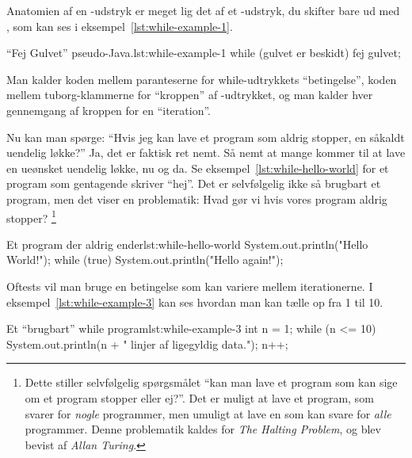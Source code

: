 
		Anatomien af en -udstryk er meget lig det af et
		-udstryk, du skifter bare  ud med
		, som kan ses i eksempel~\ref{lst:while-example-1}.

		\begin{JavaCode}{``Fej Gulvet'' pseudo-Java.}{lst:while-example-1}
			while (gulvet er beskidt) {
				fej gulvet;
			}
		\end{JavaCode}

		Man kalder koden mellem paranteserne for while-udtrykkets ``betingelse'',
		koden mellem tuborg-klammerne for ``kroppen'' af
		-udtrykket, og man kalder hver gennemgang af kroppen
		for en ``iteration''.

		Nu kan man spørge: ``Hvis jeg kan lave et program som aldrig stopper, en
		såkaldt uendelig løkke?'' Ja, det er faktisk ret nemt. Så nemt at mange
		kommer til at lave en ueønsket uendelig løkke, nu og da. Se
		eksempel~\ref{lst:while-hello-world}
		for et program som gentagende skriver ``hej''. Det er selvfølgelig ikke
		så brugbart et program, men det viser en problematik: Hvad gør vi hvis
		vores program aldrig stopper?  \footnote{Dette stiller selvfølgelig spørgsmålet ``kan man lave et program som kan sige om et program stopper eller ej?''. Det er muligt at lave et program, som svarer for \emph{nogle} programmer, men umuligt at lave en som kan svare for \emph{alle} programmer. Denne problematik kaldes for \emph{The Halting Problem}, og blev bevist af \emph{Allan Turing}.}

		\begin{JavaCode}{Et program der aldrig ender}{lst:while-hello-world}
			System.out.println("Hello World!");
			while (true) {
				System.out.println("Hello again!");
			}
		\end{JavaCode}

		 Oftests vil man bruge
		en betingelse som kan variere mellem iterationerne. I
		eksempel~\ref{lst:while-example-3} kan ses hvordan man kan tælle op fra
		1 til 10.

		\begin{JavaCode}{Et ``brugbart'' while program}{lst:while-example-3}
			int n = 1;
			while (n <= 10) {
				System.out.println(n + " linjer af ligegyldig data.");
				n++;
			}
		\end{JavaCode}



